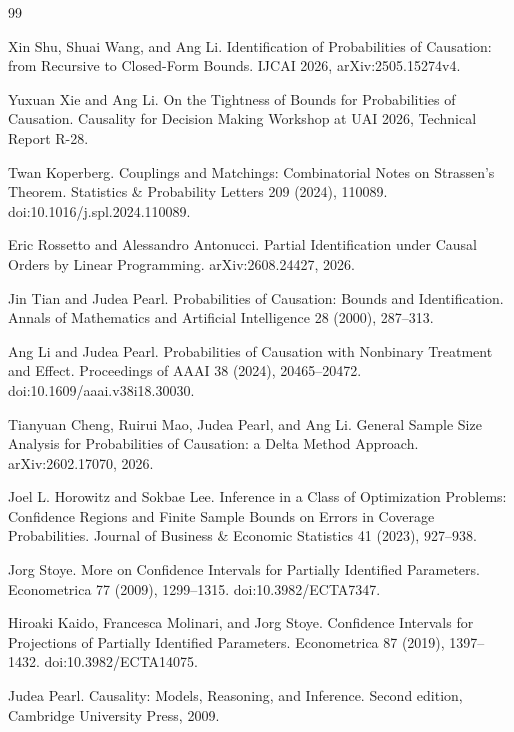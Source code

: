 \documentclass{article}
\begin{document}
\begin{thebibliography}{99}

   Xin Shu, Shuai Wang, and Ang Li. Identification of Probabilities of Causation: from Recursive to Closed-Form Bounds. IJCAI 2026, arXiv:2505.15274v4.

   Yuxuan Xie and Ang Li. On the Tightness of Bounds for Probabilities of Causation. Causality for Decision Making Workshop at UAI 2026, Technical Report R-28.

   Twan Koperberg. Couplings and Matchings: Combinatorial Notes on Strassen's Theorem. Statistics \& Probability Letters 209 (2024), 110089. doi:10.1016/j.spl.2024.110089.

   Eric Rossetto and Alessandro Antonucci. Partial Identification under Causal Orders by Linear Programming. arXiv:2608.24427, 2026.

   Jin Tian and Judea Pearl. Probabilities of Causation: Bounds and Identification. Annals of Mathematics and Artificial Intelligence 28 (2000), 287--313.

   Ang Li and Judea Pearl. Probabilities of Causation with Nonbinary Treatment and Effect. Proceedings of AAAI 38 (2024), 20465--20472. doi:10.1609/aaai.v38i18.30030.

   Tianyuan Cheng, Ruirui Mao, Judea Pearl, and Ang Li. General Sample Size Analysis for Probabilities of Causation: a Delta Method Approach. arXiv:2602.17070, 2026.

   Joel L. Horowitz and Sokbae Lee. Inference in a Class of Optimization Problems: Confidence Regions and Finite Sample Bounds on Errors in Coverage Probabilities. Journal of Business \& Economic Statistics 41 (2023), 927--938.

   Jorg Stoye. More on Confidence Intervals for Partially Identified Parameters. Econometrica 77 (2009), 1299--1315. doi:10.3982/ECTA7347.

   Hiroaki Kaido, Francesca Molinari, and Jorg Stoye. Confidence Intervals for Projections of Partially Identified Parameters. Econometrica 87 (2019), 1397--1432. doi:10.3982/ECTA14075.

   Judea Pearl. Causality: Models, Reasoning, and Inference. Second edition, Cambridge University Press, 2009.


\end{thebibliography}
\end{document}
